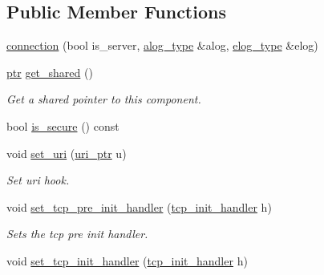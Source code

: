 \subsection*{Public Member Functions}
\begin{DoxyCompactItemize}
\item 
\hyperlink{classwebsocketpp_1_1transport_1_1asio_1_1connection_aff25718cc376e7d473d4e46c12e22551}{connection} (bool is\+\_\+server, \hyperlink{classwebsocketpp_1_1transport_1_1asio_1_1connection_a457470621386c06374aa3bd189a4715e}{alog\+\_\+type} \&alog, \hyperlink{classwebsocketpp_1_1transport_1_1asio_1_1connection_a1d2ac8c55817ecadf12be51f49578ca5}{elog\+\_\+type} \&elog)
\item 
\hyperlink{classwebsocketpp_1_1transport_1_1asio_1_1connection_aa6f25556860a154c4dacb4dac1dce8e4}{ptr} \hyperlink{classwebsocketpp_1_1transport_1_1asio_1_1connection_ac190efbc8cfd2654bc07b5b9382c36cc}{get\+\_\+shared} ()
\begin{DoxyCompactList}\small\item\em Get a shared pointer to this component. \end{DoxyCompactList}\item 
bool \hyperlink{classwebsocketpp_1_1transport_1_1asio_1_1connection_a10abc3a4d163f55f017d262e7af42fb0}{is\+\_\+secure} () const 
\item 
void \hyperlink{classwebsocketpp_1_1transport_1_1asio_1_1connection_abe1def82c2be645adfc9f769aafb1a0d}{set\+\_\+uri} (\hyperlink{namespacewebsocketpp_aae370ea5ac83a8ece7712cb39fc23f5b}{uri\+\_\+ptr} u)
\begin{DoxyCompactList}\small\item\em Set uri hook. \end{DoxyCompactList}\item 
void \hyperlink{classwebsocketpp_1_1transport_1_1asio_1_1connection_ac71341129ff5389fa84cd9ef13c8c05e}{set\+\_\+tcp\+\_\+pre\+\_\+init\+\_\+handler} (\hyperlink{namespacewebsocketpp_1_1transport_1_1asio_ad12345b8638872037c87db068467233d}{tcp\+\_\+init\+\_\+handler} h)
\begin{DoxyCompactList}\small\item\em Sets the tcp pre init handler. \end{DoxyCompactList}\item 
void \hyperlink{classwebsocketpp_1_1transport_1_1asio_1_1connection_abb0254e3207691c45c9ca7061352a90a}{set\+\_\+tcp\+\_\+init\+\_\+handler} (\hyperlink{namespacewebsocketpp_1_1transport_1_1asio_ad12345b8638872037c87db068467233d}{tcp\+\_\+init\+\_\+handler} h)

\end{DoxyCompactItemize}
